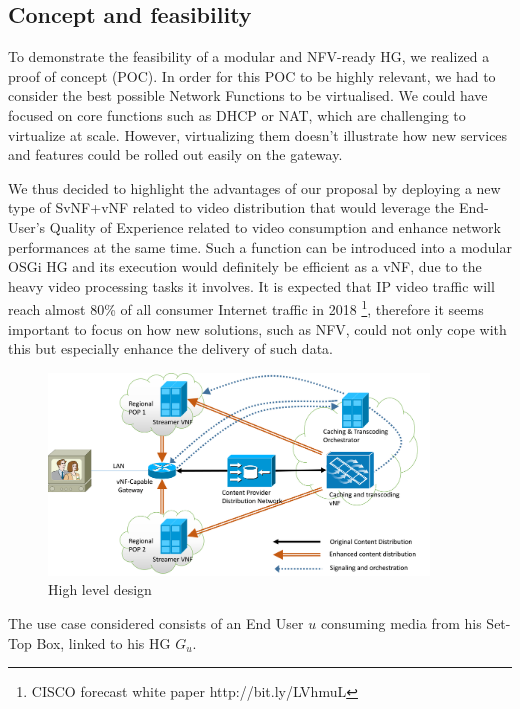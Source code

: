 \subsection{Concept and feasibility}
To demonstrate the feasibility of a modular and NFV-ready HG, we realized a proof of concept (POC).
In order for this POC to be highly relevant, we had to consider the best possible Network Functions to be virtualised.
We could have focused on core functions such as DHCP or NAT, which are challenging to virtualize at scale. However, virtualizing them doesn't illustrate how new services and features could be rolled out easily on the gateway.

We thus decided to highlight the advantages of our proposal by deploying a new type of SvNF+vNF related to video distribution that would leverage the End-User's Quality of Experience related to video consumption and enhance network performances at the same time.
Such a function can be introduced into a modular OSGi HG and its execution would definitely be efficient as a vNF, due to the heavy video processing tasks it involves.
It is expected that IP video traffic will reach almost 80\% of all consumer Internet traffic in 2018 \footnote{CISCO forecast white paper http://bit.ly/LVhmuL }, therefore it seems important to focus on how new solutions, such as NFV, could not only cope with this but especially enhance the delivery of such data.

\begin{figure}
	
	\center

	\includegraphics[width=0.90\textwidth,natwidth=8132,natheight=4335]{fig/highleveldesign.png}
	\caption{ High level design
    \label{fig:hld}
    }

\end{figure}

The use case considered consists of an End User $u$ consuming media from his Set-Top Box, linked to his HG $G_{u}$.


